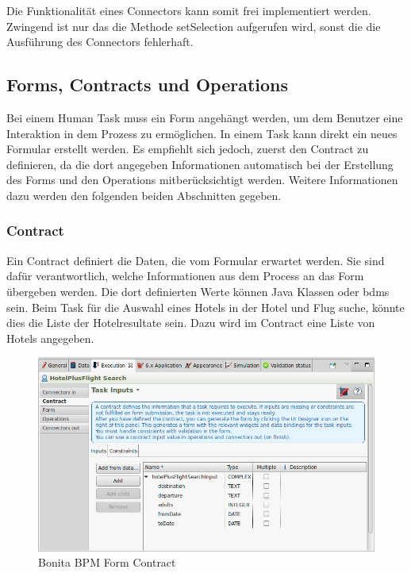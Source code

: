 Die Funktionalität eines Connectors kann somit frei implementiert werden. Zwingend ist nur das die Methode setSelection aufgerufen wird, sonst die die Ausführung des Connectors fehlerhaft.

\subsection{Forms, Contracts und Operations}
\label{sec:analyse:bonita:forms}
Bei einem Human Task muss ein Form angehängt werden, um dem Benutzer eine Interaktion in dem Prozess zu ermöglichen.
In einem Task kann direkt ein neues Formular erstellt werden. Es empfiehlt sich jedoch, zuerst den Contract zu definieren, da die dort angegeben Informationen automatisch bei der Erstellung des Forms und den Operations mitberücksichtigt werden. Weitere Informationen dazu werden den folgenden beiden Abschnitten gegeben.

\subsubsection{Contract}
\label{sec:analyse:bonita:forms:contract}
Ein Contract definiert die Daten, die vom Formular erwartet werden. Sie sind dafür verantwortlich, welche Informationen aus dem Process an das Form übergeben werden. Die dort definierten Werte können Java Klassen oder \glspl{bdm} sein. Beim Task für die Auswahl eines Hotels in der Hotel und Flug suche, könnte dies die Liste der Hotelresultate sein. Dazu wird im Contract eine Liste von Hotels angegeben.
\begin{figure}[H]
	\centering
	\includegraphics[width=1\textwidth]{images/bonita-contract.png}
	\caption{Bonita BPM Form Contract}
	\label{fig:analyse:bonita:forms:contract}
\end{figure}

